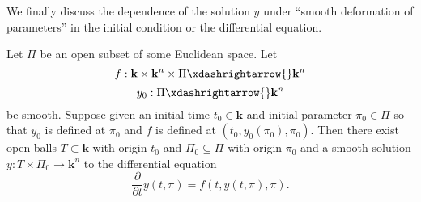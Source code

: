 \documentclass[reqno]{amsart} 
\begin{document}
We finally discuss the dependence of the solution $y$
under ``smooth deformation of parameters'' in the initial
condition
or the differential equation.
\begin{theorem}
  Let $\Pi$
  be
  an  open subset of some
  Euclidean space.
  Let
\begin{equation*}
  f : \mathbf{k} \times \mathbf{k}^n \times \Pi \xdashrightarrow{} \mathbf{k}^n
\end{equation*}
\begin{equation*}
  y_0 : \Pi \xdashrightarrow{} \mathbf{k}^n
\end{equation*}
be smooth.
Suppose given an initial time $t_0 \in \mathbf{k}$ and initial parameter
$\pi_0 \in \Pi$
so that $y_0$ is defined at $\pi_0$
and $f$ is defined at
$(t_0,y_0(\pi_0),\pi_0)$.
Then there exist open balls
$T \subset \mathbf{k}$ with origin $t_0$
and $\Pi_0 \subseteq \Pi$ with origin $\pi_0$
and a smooth solution $y : T \times \Pi_0 \rightarrow
\mathbf{k}^n$
to the differential equation
\begin{equation}\label{eq:diffeq-with-params}
    \frac{\partial}{\partial t} y(t,\pi)
  = f(t,y(t,\pi),\pi).
\end{equation}
\end{theorem}
\end{document}
